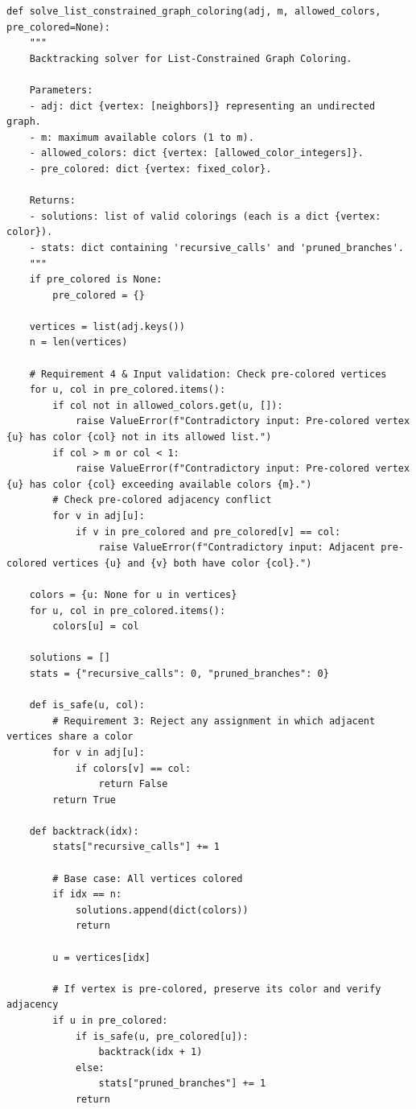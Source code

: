 \documentclass[12pt]{article}
\begin{document}
\begin{lstlisting}[style=code]
def solve_list_constrained_graph_coloring(adj, m, allowed_colors, pre_colored=None):
    """
    Backtracking solver for List-Constrained Graph Coloring.
    
    Parameters:
    - adj: dict {vertex: [neighbors]} representing an undirected graph.
    - m: maximum available colors (1 to m).
    - allowed_colors: dict {vertex: [allowed_color_integers]}.
    - pre_colored: dict {vertex: fixed_color}.
    
    Returns:
    - solutions: list of valid colorings (each is a dict {vertex: color}).
    - stats: dict containing 'recursive_calls' and 'pruned_branches'.
    """
    if pre_colored is None:
        pre_colored = {}

    vertices = list(adj.keys())
    n = len(vertices)

    # Requirement 4 & Input validation: Check pre-colored vertices
    for u, col in pre_colored.items():
        if col not in allowed_colors.get(u, []):
            raise ValueError(f"Contradictory input: Pre-colored vertex {u} has color {col} not in its allowed list.")
        if col > m or col < 1:
            raise ValueError(f"Contradictory input: Pre-colored vertex {u} has color {col} exceeding available colors {m}.")
        # Check pre-colored adjacency conflict
        for v in adj[u]:
            if v in pre_colored and pre_colored[v] == col:
                raise ValueError(f"Contradictory input: Adjacent pre-colored vertices {u} and {v} both have color {col}.")

    colors = {u: None for u in vertices}
    for u, col in pre_colored.items():
        colors[u] = col

    solutions = []
    stats = {"recursive_calls": 0, "pruned_branches": 0}

    def is_safe(u, col):
        # Requirement 3: Reject any assignment in which adjacent vertices share a color
        for v in adj[u]:
            if colors[v] == col:
                return False
        return True

    def backtrack(idx):
        stats["recursive_calls"] += 1

        # Base case: All vertices colored
        if idx == n:
            solutions.append(dict(colors))
            return

        u = vertices[idx]

        # If vertex is pre-colored, preserve its color and verify adjacency
        if u in pre_colored:
            if is_safe(u, pre_colored[u]):
                backtrack(idx + 1)
            else:
                stats["pruned_branches"] += 1
            return


\end{lstlisting}
\end{document}
